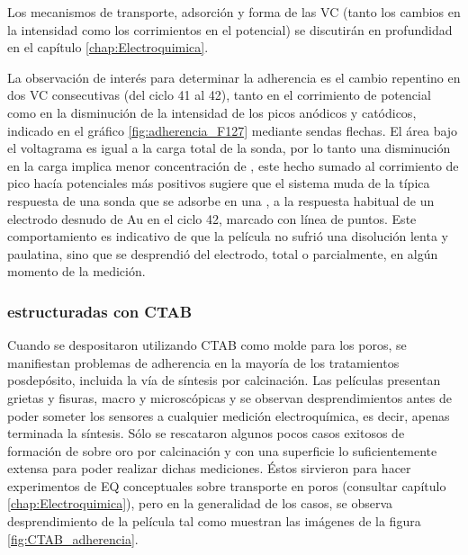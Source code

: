 			 Los mecanismos de transporte, adsorción y forma de las VC (tanto los cambios en la intensidad como los corrimientos en el potencial) se discutirán en profundidad en el capítulo \ref{chap:Electroquimica}. 
		
			 La observación de interés para determinar la adherencia es el cambio repentino en dos VC consecutivas (del ciclo 41 al 42), tanto en el corrimiento de potencial como en la disminución de la intensidad de los picos anódicos y catódicos, indicado en el gráfico \ref{fig:adherencia_F127} mediante sendas flechas. El área bajo el voltagrama es igual a la carga total de la sonda, por lo tanto una disminución en la carga implica menor concentración de \aminorutenio, este hecho sumado al corrimiento de pico hacía potenciales más positivos sugiere que el sistema muda de la típica respuesta de una sonda que se adsorbe en una \pdm, a la respuesta habitual de un electrodo desnudo de Au en el ciclo 42, marcado con línea de puntos. Este comportamiento es indicativo de que la película no sufrió una disolución lenta y paulatina, sino que se desprendió del electrodo, total o parcialmente, en algún momento de la medición.	     		

		\subsubsection{\pdm\space estructuradas con CTAB}	     		
				     		
			Cuando se despositaron \pdm\space utilizando CTAB como molde para los poros, se manifiestan problemas de adherencia en la mayoría de los tratamientos posdepósito, incluida la vía de síntesis por calcinación. Las películas presentan grietas y fisuras, macro y microscópicas y se observan desprendimientos antes de poder someter los sensores a cualquier medición electroquímica, es decir, apenas terminada la síntesis. Sólo se rescataron algunos pocos casos exitosos de formación de \pdmC\space sobre oro por calcinación y con una superficie lo suficientemente extensa para poder realizar dichas mediciones. Éstos sirvieron para hacer experimentos de EQ conceptuales sobre transporte en poros (consultar capítulo \ref{chap:Electroquimica}), pero en la generalidad de los casos, se observa desprendimiento de la película tal como muestran las imágenes de la figura \ref{fig:CTAB_adherencia}.

